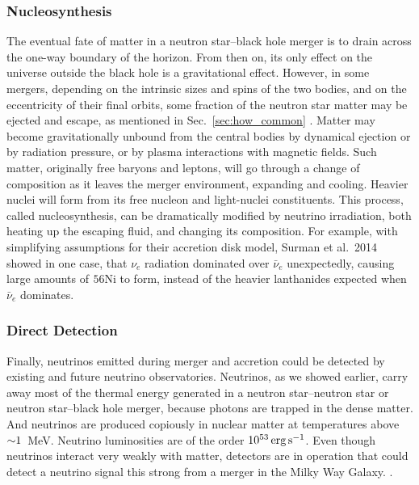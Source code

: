 \subsubsection{Nucleosynthesis}
\label{sssc:nucleosynthesis}
The eventual fate of matter in a neutron star--black hole merger is to drain
across the one-way boundary of the horizon. From then on, its only effect on
the universe outside the black hole is a gravitational effect.
However, in some mergers, depending on the intrinsic sizes and spins of the
two bodies, and on the eccentricity of their final orbits, some fraction of the
neutron star matter may be ejected and escape, as mentioned in
Sec.~\ref{sec:how_common} \citep{latt1974-bhns_ejecta}.
Matter may become gravitationally unbound from the central bodies by dynamical
ejection or by radiation pressure, or by plasma interactions with magnetic
fields.
Such matter, originally free baryons and leptons, will go through a change of
composition as it leaves the merger environment, expanding and cooling.
Heavier nuclei will form from its free nucleon and light-nuclei constituents.
This process, called nucleosynthesis, can be dramatically modified by neutrino
irradiation, both heating up the escaping fluid, and changing its composition.
For example, with simplifying assumptions for their accretion disk model,
Surman et al.\ 2014
showed in one case, that $\nu_e$ radiation dominated over $\bar{\nu}_e$
unexpectedly, causing large amounts of $^{}56$Ni to form, instead of the
heavier lanthanides expected when $\bar{\nu}_e$ dominates.

\subsubsection{Direct Detection}
\label{sssc:nu_detection}
Finally, neutrinos emitted during merger and accretion could be detected by
existing and future neutrino observatories. Neutrinos, as we showed earlier,
carry away most of the thermal energy generated in a neutron star--neutron star
\nsns or neutron star--black hole \nsbh merger, because photons are trapped in
the dense matter. And neutrinos are produced copiously in nuclear matter at
temperatures above $\mathord{\sim}1$~MeV.
Neutrino luminosities are of the order $10^{53}\,{\rm erg\,s}^{-1}$. Even
though neutrinos interact very weakly with matter, detectors are in operation
that could detect a neutrino signal this strong from a merger in the
Milky Way Galaxy.
.

